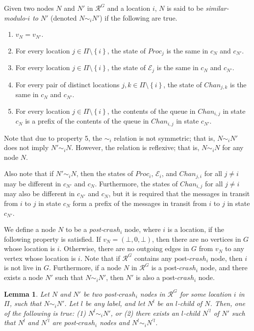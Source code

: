 \documentclass[11pt]{article}
\numberwithin{theorem}{section}
\newtheorem{lemma}[theorem]{Lemma}
\newcommand{\set}[1]{\left\{#1\right\}}
\begin{document}
Given two nodes $N$ and $N'$ in $\mathcal{R}^{G}$ and a location $i$,
$N$ is said to be \emph{similar-modulo-$i$ to} $N'$ (denoted $N \sim_i N'$)
if the following are true. 
\begin{enumerate}
\item $v_N = v_{N'}$.
\item For every location $j \in \Pi \setminus \set{i}$, the state of
       $Proc_j$ is the same in $c_N$ and $c_{N'}$.
\item For every location $j \in \Pi \setminus \set{i}$, the state of $\mathcal{E}_j$ is the same in $c_N$ and $c_{N'}$. 
\item For every pair of distinct locations $j,k \in \Pi \setminus \set{i}$,
      the state of $Chan_{j,k}$ is the same in $c_N$ and $c_{N'}$. 
\item For every location $j \in \Pi \setminus \set{i}$, the contents of
      the queue in $Chan_{i,j}$ in state $c_N$ is a prefix of the contents
      of the queue in $Chan_{i,j}$ in state $c_{N'}$.
\end{enumerate}

 Note that due to property 5, the $\sim_i$ relation is not symmetric; that is, $N \sim_i N'$ does not imply $N' \sim_i N$. However, the relation is reflexive; that is, $N \sim_i N$ for any node $N$.

Also note that if $N' \sim_i N$, then the states of $Proc_i$, $\mathcal{E}_i$, and $Chan_{j,i}$ for all $j \neq i$ may be different in $c_{N'}$ and $c_{N}$. Furthermore, the states of $Chan_{i,j}$ for all $j \neq i$ may also be different in $c_{N'}$ and $c_{N}$, but it is required that the messages in transit from $i$ to $j$ in state $c_N$ form a prefix of the messages in transit from $i$ to $j$ in state $c_{N'}$.

We define a node $N$ to be a \emph{post-$crash_i$} node, where $i$ is a location,  if the following property is satisfied. If $v_N = (\bot, 0 ,\bot)$, then there are no vertices in $G$ whose location is $i$. Otherwise, there are no outgoing edges in $G$ from $v_N$ to any vertex whose location is $i$. Note that if $\mathcal{R}^G$ contains any post-$crash_i$ node, then $i$ is not live in $G$. Furthermore, if a node $N$ in $\mathcal{R}^G$ is a post-$crash_i$ node, and there exists a node $N'$ such that $N \sim_i N'$, then $N'$ is also a post-$crash_i$ node.
 
 \begin{lemma}\label{lem:similarModuloChild}
 Let $N$ and $N'$ be two post-$crash_i$ nodes in $\mathcal{R}^{G}$ for some location $i$ in $\Pi$, such that $N \sim_i N'$. Let $l$ be any label, and let
 $N^l$ be an $l$-child of $N$. Then, one of the following is true: (1) $N^l \sim_i N'$, or (2) there exists an $l$-child $N^{\prime l}$ of $N'$ such that $N^l$ and $N^{\prime l}$ are post-$crash_i$ nodes and $N^l \sim_i N^{\prime l}$.
\end{lemma}
\end{document}

